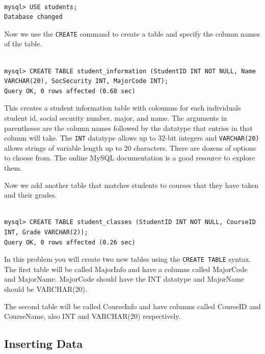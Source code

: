 \begin{lstlisting}

mysql> USE students;
Database changed

\end{lstlisting}

Now we use the {\tt CREATE} command to create a table and specify the column names of the table.

\begin{lstlisting}

mysql> CREATE TABLE student_information (StudentID INT NOT NULL, Name VARCHAR(20), SocSecurity INT, MajorCode INT);
Query OK, 0 rows affected (0.68 sec)

\end{lstlisting}

This creates a student information table with coloumns for each individuals student id, social security number, major, and name.  The arguments in parentheses are the column names followed by the datatype that entries in that column will take.  The {\tt INT} datatype allows up to 32-bit integers and {\tt VARCHAR(20)} allows strings of variable length up to 20 characters.  There are dozens of options to choose from.  The online MySQL documentation is a good resource to explore them.

Now we add another table that matches students to courses that they have taken and their grades.

\begin{lstlisting}

mysql> CREATE TABLE student_classes (StudentID INT NOT NULL, CourseID INT, Grade VARCHAR(2));
Query OK, 0 rows affected (0.26 sec)

\end{lstlisting}

\begin{problem}

In this problem you will create two new tables using the {\tt CREATE TABLE} syntax.  The first table will be called MajorInfo and have a columns called MajorCode and MajorName.  MajorCode should have the INT datatype and MajorName should be VARCHAR(20).

The second table will be called CourseInfo and have columns called CourseID and CourseName, also INT and VARCHAR(20) respectively.

\end{problem}

\subsection{Inserting Data}

